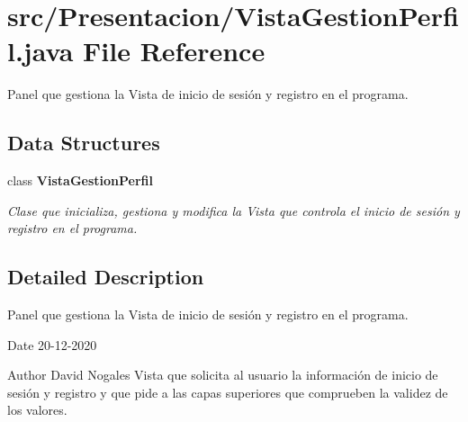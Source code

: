 \section{src/\+Presentacion/\+Vista\+Gestion\+Perfil.java File Reference}
\label{_vista_gestion_perfil_8java}


Panel que gestiona la Vista de inicio de sesión y registro en el programa.  


\subsection*{Data Structures}
\begin{DoxyCompactItemize}
\item 
class \textbf{ Vista\+Gestion\+Perfil}
\begin{DoxyCompactList}\small\item\em Clase que inicializa, gestiona y modifica la Vista que controla el inicio de sesión y registro en el programa. \end{DoxyCompactList}\end{DoxyCompactItemize}


\subsection{Detailed Description}
Panel que gestiona la Vista de inicio de sesión y registro en el programa. 

\begin{DoxyDate}{Date}
20-\/12-\/2020 
\end{DoxyDate}
\begin{DoxyAuthor}{Author}
David Nogales Vista que solicita al usuario la información de inicio de sesión y registro y que pide a las capas superiores que comprueben la validez de los valores. 
\end{DoxyAuthor}
